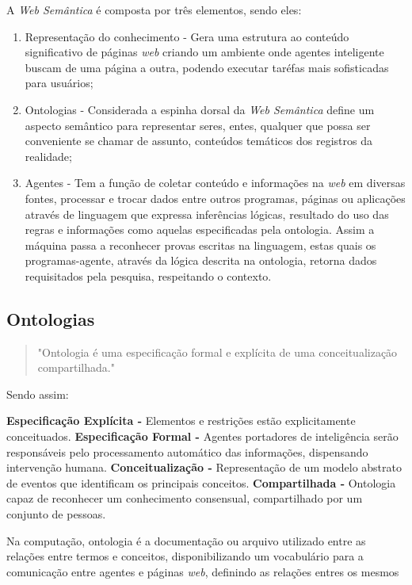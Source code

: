 A \textit{Web Semântica} é composta por três elementos, sendo eles:
\begin{enumerate}
\item Representação do conhecimento - Gera uma estrutura ao conteúdo significativo de páginas \textit{web} criando um ambiente onde agentes inteligente buscam de uma página a outra, podendo executar taréfas mais sofisticadas para usuários;
\item Ontologias -  Considerada a espinha dorsal da \textit{Web Semântica} define um aspecto semântico para representar seres, entes, qualquer que possa ser conveniente se chamar de assunto, conteúdos temáticos dos registros da realidade;
\item Agentes - Tem a função de coletar conteúdo e informações na \textit{web} em diversas fontes, processar e trocar dados entre outros programas, páginas ou aplicações através de linguagem que expressa inferências lógicas, resultado do uso das regras e informações como aquelas especificadas pela ontologia. Assim a máquina passa a reconhecer provas escritas na linguagem, estas quais os programas-agente, através da lógica descrita na ontologia, retorna dados requisitados pela pesquisa, respeitando o contexto.
\end{enumerate}

\subsection{Ontologias}

\begin{quote}
"Ontologia é uma especificação formal e explícita de uma conceitualização compartilhada\cite{gruber:1993}."
\end{quote}

Sendo assim:

\textbf{Especificação Explícita -} Elementos e restrições estão explicitamente conceituados.
\textbf{Especificação Formal -} Agentes portadores de inteligência serão responsáveis pelo processamento automático das informações, dispensando intervenção humana.
\textbf{Conceitualização -} Representação de um modelo abstrato de eventos que identificam os principais conceitos.
\textbf{Compartilhada -} Ontologia capaz de reconhecer um conhecimento consensual, compartilhado por um conjunto de pessoas.

Na computação, ontologia é a documentação ou arquivo utilizado entre as relações entre termos e conceitos, disponibilizando um vocabulário para a comunicação entre agentes e páginas \textit{web}, definindo as relações entres os mesmos\cite{pickler:2007}

